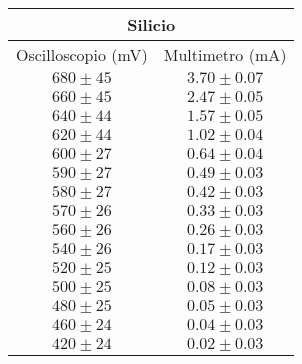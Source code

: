 \documentclass[@MAIN@]{subfiles}
\begin{document}
\begin{tabular}{ ||c|c|| }
  \hline
  \multicolumn{2}{||c||}{Silicio}\\
  \hline
  Oscilloscopio (mV) & Multimetro (mA) \\
  \hline
  $680\pm 45$ & $3.70\pm0.07$ \\
  \hline
  $660\pm 45$ & $2.47\pm0.05$ \\
  \hline
  $640\pm 44$ & $1.57\pm0.05$ \\
  \hline
  $620\pm 44$ & $1.02\pm0.04$ \\
  \hline
  $600\pm 27$ & $0.64\pm0.04$ \\
  \hline
  $590\pm 27$ & $0.49\pm0.03$ \\
  \hline
  $580\pm 27$ & $0.42\pm0.03$ \\
  \hline
  $570\pm 26$ & $0.33\pm0.03$ \\
  \hline
  $560\pm 26$ & $0.26\pm0.03$ \\
  \hline
  $540\pm 26$ & $0.17\pm0.03$ \\
  \hline
  $520\pm 25$ & $0.12\pm0.03$ \\
  \hline 
  $500\pm 25$ & $0.08\pm0.03$ \\
  \hline 
  $480\pm 25$ & $0.05\pm0.03$ \\
  \hline 
  $460\pm 24$ & $0.04\pm0.03$ \\
  \hline 
  $420\pm 24$ & $0.02\pm0.03$ \\
  \hline 
  
\end{tabular}   
\end{document}
